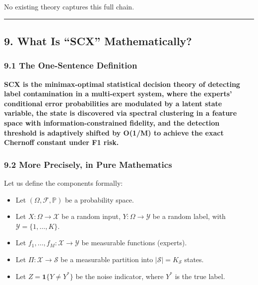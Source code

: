 \documentclass[
  12pt,
]{article}
\providecommand{\tightlist}{%
  \setlength{\itemsep}{0pt}\setlength{\parskip}{0pt}}
\begin{document}
No existing theory captures this full chain.

\begin{center}\rule{0.5\linewidth}{0.5pt}\end{center}

\subsection{9. What Is ``SCX''
Mathematically?}\label{what-is-scx-mathematically}

\subsubsection{9.1 The One-Sentence
Definition}\label{the-one-sentence-definition}

\textbf{SCX is the minimax-optimal statistical decision theory of
detecting label contamination in a multi-expert system, where the
experts' conditional error probabilities are modulated by a latent state
variable, the state is discovered via spectral clustering in a feature
space with information-constrained fidelity, and the detection threshold
is adaptively shifted by O(1/M) to achieve the exact Chernoff constant
under F1 risk.}

\subsubsection{9.2 More Precisely, in Pure
Mathematics}\label{more-precisely-in-pure-mathematics}

Let us define the components formally:

\begin{itemize}
\tightlist
\item
  Let \((\Omega, \mathcal{F}, \mathbb{P})\) be a probability space.
\item
  Let \(X: \Omega \to \mathcal{X}\) be a random input,
  \(Y: \Omega \to \mathcal{Y}\) be a random label, with
  \(\mathcal{Y} = \{1, \dots, K\}\).
\item
  Let \(f_1, \dots, f_M: \mathcal{X} \to \mathcal{Y}\) be measurable
  functions (experts).
\item
  Let \(\Pi: \mathcal{X} \to \mathcal{S}\) be a measurable partition
  into \(|\mathcal{S}| = K_{\mathcal{S}}\) states.
\item
  Let \(Z = \mathbf{1}\{Y \neq Y^*\}\) be the noise indicator, where
  \(Y^*\) is the true label.
\end{itemize}
\end{document}
